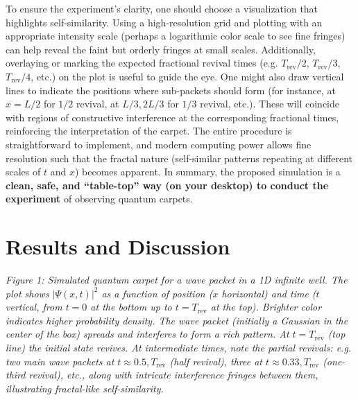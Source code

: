 \documentclass[11pt,a4paper]{article}
\begin{document}
To ensure the experiment’s clarity, one should choose a visualization that highlights self-similarity. Using a high-resolution grid and plotting with an appropriate intensity scale (perhaps a logarithmic color scale to see fine fringes) can help reveal the faint but orderly fringes at small scales. Additionally, overlaying or marking the expected fractional revival times (e.g. $T_{\text{rev}}/2$, $T_{\text{rev}}/3$, $T_{\text{rev}}/4$, etc.) on the plot is useful to guide the eye. One might also draw vertical lines to indicate the positions where sub-packets should form (for instance, at $x=L/2$ for $1/2$ revival, at $L/3, 2L/3$ for $1/3$ revival, etc.). These will coincide with regions of constructive interference at the corresponding fractional times, reinforcing the interpretation of the carpet. The entire procedure is straightforward to implement, and modern computing power allows fine resolution such that the fractal nature (self-similar patterns repeating at different scales of $t$ and $x$) becomes apparent. In summary, the proposed simulation is a \textbf{clean, safe, and “table-top” way (on your desktop) to conduct the experiment} of observing quantum carpets.

\section{Results and Discussion}

\emph{Figure 1: Simulated quantum carpet for a wave packet in a 1D infinite well. The plot shows $|\Psi(x,t)|^2$ as a function of position ($x$ horizontal) and time ($t$ vertical, from $t=0$ at the bottom up to $t=T_{\text{rev}}$ at the top). Brighter color indicates higher probability density. The wave packet (initially a Gaussian in the center of the box) spreads and interferes to form a rich pattern. At $t=T_{\text{rev}}$ (top line) the initial state revives. At intermediate times, note the partial revivals: e.g. two main wave packets at $t\approx 0.5,T_{\text{rev}}$ (half revival), three at $t\approx 0.33,T_{\text{rev}}$ (one-third revival), etc., along with intricate interference fringes between them, illustrating fractal-like self-similarity.}
\end{document}
